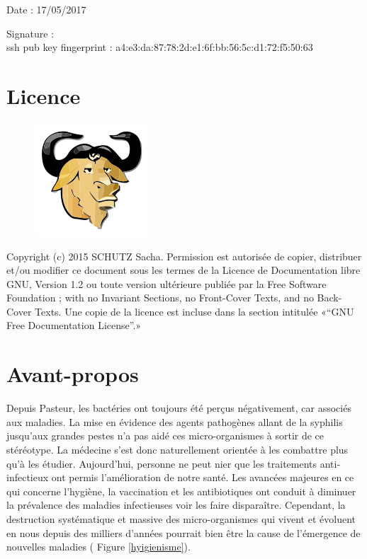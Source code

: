 \documentclass[12pt,a4paper]{article}
\begin{document}
Date : 17/05/2017

\vspace{0.5cm}

Signature : \\

ssh pub key fingerprint : a4:e3:da:87:78:2d:e1:6f:bb:56:5c:d1:72:f5:50:63
\vfill 

\section*{Licence}

\begin{figure}
\includegraphics[scale=0.5]{img/gfdl.png}\hfill
\end{figure}

Copyright (c) 2015 SCHUTZ Sacha. Permission est autorisée de copier,
distribuer et/ou modifier ce document sous les termes de la Licence de
Documentation libre GNU, Version 1.2 ou toute version ultérieure publiée
par la Free Software Foundation ; with no Invariant Sections, no
Front-Cover Texts, and no Back-Cover Texts. Une copie de la licence est
incluse dans la section intitulée «``GNU Free Documentation License''.»

\thispagestyle{empty} 
\setcounter{page}{0}
\thispagestyle{empty} 

\newpage

\tableofcontents
\newpage


\section{Avant-propos}

Depuis Pasteur, les bactéries ont toujours été perçus négativement, car associés aux maladies. La mise en évidence des agents pathogènes allant de la syphilis jusqu'aux grandes pestes n'a pas aidé ces micro-organismes à sortir de ce stéréotype. La médecine s'est donc naturellement orientée à les combattre plus qu'à les étudier.
Aujourd'hui, personne ne peut nier que les traitements anti-infectieux ont permis l'amélioration de notre santé. 
Les avancées majeures en ce qui concerne l'hygiène, la vaccination et les antibiotiques ont conduit à diminuer la prévalence des maladies infectieuses voir les faire disparaître. Cependant, la destruction systématique et massive des micro-organismes qui vivent et évoluent en nous depuis des milliers d'années pourrait bien être la cause de l'émergence de nouvelles maladies ( Figure \ref{hyigienisme}).
\end{document}
